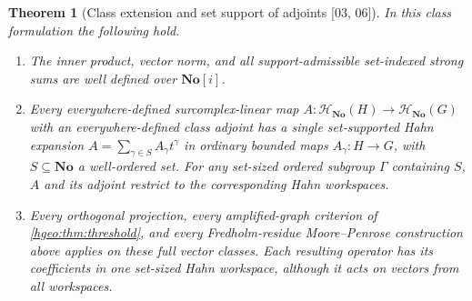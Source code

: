 \documentclass[11pt,letterpaper]{article}
\numberwithin{equation}{section}
\newtheorem{theorem}{Theorem}[section]
\theoremstyle{definition}
\theoremstyle{remark}
\newcommand{\No}{\mathbf{No}}
\newcommand{\src}[1]{\textup{\textsf{\small[#1]}}}
\begin{document}
\begin{theorem}[Class extension and set support of adjoints \src{03, 06}]
\label{hgeo:thm:class}
In this class formulation the following hold.
\begin{enumerate}[label=\textup{(\roman*)}]
\item The inner product, vector norm, and all support-admissible
set-indexed strong sums are well defined over $\No[i]$.
\item Every everywhere-defined surcomplex-linear map
$A:\mathscr H_{\No}(H)\to\mathscr H_{\No}(G)$ with an
everywhere-defined class adjoint has a single \emph{set-supported}
Hahn expansion $A=\sum_{\gamma\in S}A_\gamma t^\gamma$ in ordinary bounded
maps $A_\gamma:H\to G$, with $S\subseteq\No$ a well-ordered set. For any
set-sized ordered subgroup $\Gamma$ containing $S$, $A$ and its adjoint
restrict to the corresponding Hahn workspaces.
\item Every orthogonal projection, every amplified-graph criterion
of \cref{hgeo:thm:threshold}, and every Fredholm-residue
Moore--Penrose construction above applies on these full vector
classes. Each resulting operator has its coefficients in one
set-sized Hahn workspace, although it acts on vectors from all
workspaces.
\end{enumerate}
\end{theorem}
\end{document}
